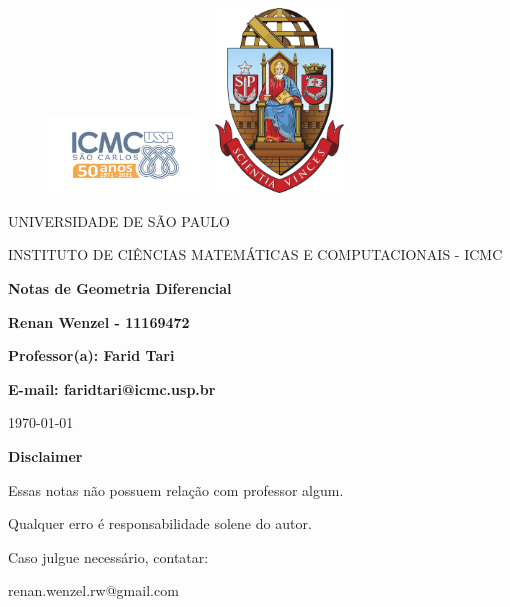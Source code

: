 \documentclass{article}
\begin{document}
\begin{figure}[ht]
	\includegraphics[width=4cm]{../icmc.png}
	\hspace{7cm}
	\includegraphics[height=4.9cm,width=4cm]{../brasao_usp_cor.jpg}
	\endminipage
\end{figure}

\begin{center}
	\vspace{1cm}
	\LARGE
	UNIVERSIDADE DE SÃO PAULO

	\vspace{1.3cm}
	\LARGE
	INSTITUTO DE CIÊNCIAS MATEMÁTICAS E COMPUTACIONAIS - ICMC

	\vspace{1.7cm}
	\Large
	\textbf{Notas de Geometria Diferencial}

	\vspace{1.3cm}
	\large
	\textbf{Renan Wenzel - 11169472}

	\vspace{1.3cm}
	\large
	\textbf{Professor(a): Farid Tari}

	\textbf{E-mail: faridtari@icmc.usp.br}

	\vspace{1.3cm}
	\today
\end{center}

\newpage
\textbf{{\Huge Disclaimer}}

{\huge Essas notas não possuem relação com professor algum.

	Qualquer erro é responsabilidade solene do autor.

	Caso julgue necessário, contatar:

	renan.wenzel.rw@gmail.com}
\tableofcontents

\newpage
\end{document}
